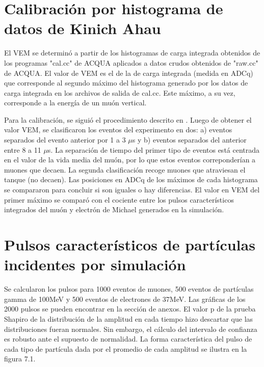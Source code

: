 \documentclass{book}
\begin{document}
\section{Calibraci\'on por histograma de datos de Kinich Ahau}
El VEM se determin\'o a partir de los histogramas de carga integrada obtenidos de los programas "cal.cc" de ACQUA aplicados a datos crudos obtenidos de "raw.cc" de ACQUA. El valor de VEM es el de la de carga integrada (medida en ADCq) que corresponde al segundo m\'aximo del histograma generado por los datos de carga integrada en los archivos de salida de cal.cc. Este m\'aximo, a su vez, corresponde a la energ\'ia de un mu\'on vertical.

Para la calibraci\'on, se sigui\'o el procedimiento descrito en \citep{ALLISON}. Luego de obtener el valor VEM, se clasificaron los eventos del experimento en dos: a) eventos separados del evento anterior por 1 a 3 $\mu$s y b) eventos separados del anterior entre 8 a 11 $\mu$s. La separaci\'on de tiempo del primer tipo de eventos est\'a centrada en el valor de la vida media del mu\'on, por lo que estos eventos correponder\'ian a muones que decaen. La segunda clasificaci\'on recoge muones que atraviesan el tanque (no decaen). Las posiciones en ADCq de los m\'aximos de cada histograma se compararon para concluir si son iguales o hay diferencias. El valor en VEM del primer m\'aximo se compar\'o con el cociente entre los pulsos caracter\'isticos integrados del mu\'on y electr\'on de Michael generados en la simulaci\'on.



\section{Pulsos caracter\'isticos de part\'iculas incidentes por simulaci\'on}

Se calcularon los pulsos para 1000 eventos de muones, 500 eventos de part\'iculas gamma de 100MeV y 500 eventos de electrones de 37MeV. Las gr\'aficas de los 2000 pulsos se pueden encontrar en la secci\'on de anexos. El valor p de la prueba Shapiro de la distribuci\'on de la amplitud en cada tiempo hizo descartar que las distribuciones fueran normales. Sin embargo, el c\'alculo del intervalo de confianza es robusto ante el supuesto de normalidad. La forma caracter\'istica del pulso de cada tipo de part\'icula dada por el promedio de cada amplitud se ilustra en la figura 7.1.
\end{document}
